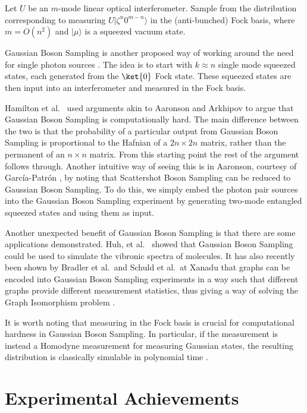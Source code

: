 \begin{problem} Let $U$ be an $m$-mode linear optical interferometer. Sample from the distribution corresponding to measuring $U|\zeta^n0^{m-n}\rangle$ in the (anti-bunched) Fock basis, where $m=O(n^2)$ and $|\mu\rangle$ is a squeezed vacuum state.
\end{problem}

Gaussian Boson Sampling is another proposed way of working around the need for single photon sources \cite{hamilton2017}. The idea is to start with $k\approx n$ single mode squeezed states, each generated from the $\ket{0}$ Fock state. These squeezed states are then input into an interferometer and measured in the Fock basis.

Hamilton et al.~\cite{hamilton2017} used arguments akin to Aaronson and Arkhipov to argue that Gaussian Boson Sampling is computationally hard. The main difference between the two is that the probability of a particular output from Gaussian Boson Sampling is proportional to the Hafnian of a $2n\times 2n$ matrix, rather than the permanent of an $n\times n$ matrix. From this starting point the rest of the argument follows through. Another intuitive way of seeing this is in Aaronson, courtesy of Garc\'{i}a-Patr\'{o}n \cite{aaronson2013}, by noting that Scattershot Boson Sampling can be reduced to Gaussian Boson Sampling. To do this, we simply embed the photon pair sources into the Gaussian Boson Sampling experiment by generating two-mode entangled squeezed states and using them as input.

Another unexpected benefit of Gaussian Boson Sampling is that there are some applications demonstrated. Huh, et al.~\cite{huh2015} showed that Gaussian Boson Sampling could be used to simulate the vibronic spectra of molecules. It has also recently been shown by Bradler et al.\ and Schuld et al.\ at Xanadu that graphs can be encoded into Gaussian Boson Sampling experiments in a way such that different graphs provide different measurement statistics, thus giving a way of solving the Graph Isomorphism problem \cite{bradler2018, schuld2019}.

It is worth noting that measuring in the Fock basis is crucial for computational hardness in Gaussian Boson Sampling. In particular, if the measurement is instead a Homodyne measurement for measuring Gaussian states, the resulting distribution is classically simulable in polynomial time \cite{bartlett2003}.

\section{Experimental Achievements}
\label{sec:experimental-achievements}

